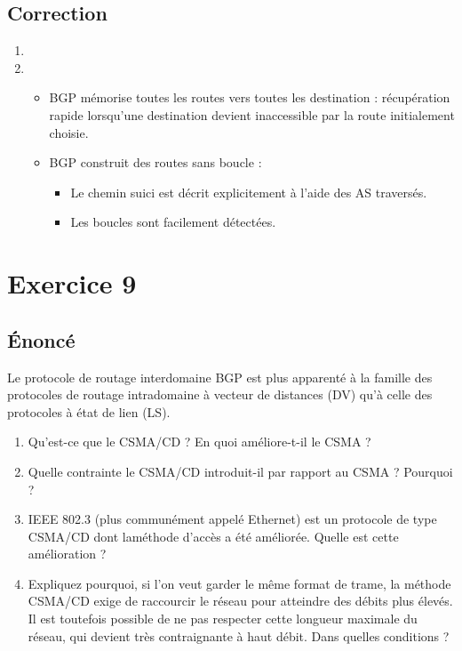 \documentclass[a4paper, 11pt, titlepage]{article}
\begin{document}
\subsection{Correction}
\begin{enumerate}[label=(\alph*)]
\item 

\item
\begin{itemize}
\item BGP mémorise toutes les routes vers toutes les destination : récupération rapide lorsqu'une destination devient inaccessible par la route initialement choisie.
\item BGP construit des routes sans boucle : \begin{itemize}
\item Le chemin suici est décrit explicitement à l'aide des AS traversés.
\item Les boucles sont facilement détectées.
\end{itemize}
\end{itemize}


\end{enumerate}



\section{Exercice 9}
\subsection{\'Enoncé}
Le protocole de routage interdomaine BGP est plus apparenté à la famille des protocoles de routage intradomaine à vecteur de distances (DV) qu’à celle des protocoles à état de lien (LS).
\begin{enumerate}[label=(\alph*)]
  \item Qu’est-ce que le CSMA/CD ? En quoi améliore-t-il le CSMA ?
  \item Quelle contrainte le CSMA/CD introduit-il par rapport au CSMA ? Pourquoi ?
  \item IEEE 802.3 (plus communément appelé Ethernet) est un protocole de type CSMA/CD dont laméthode d'accès a été améliorée. Quelle est cette amélioration ?
  \item Expliquez pourquoi, si l’on veut garder le même format de trame, la méthode CSMA/CD exige de raccourcir le réseau pour atteindre des débits plus élevés. Il est toutefois possible de ne pas respecter cette longueur maximale du réseau, qui devient très contraignante à haut débit. Dans quelles conditions ?
\end{enumerate}
\end{document}
